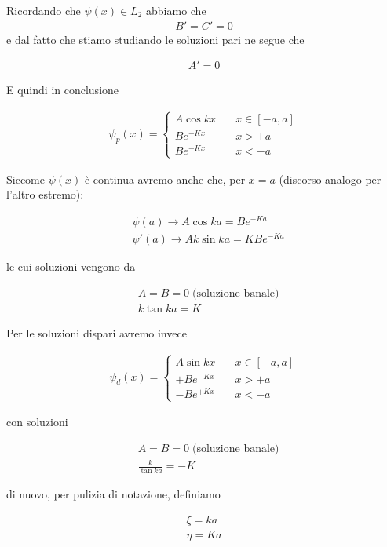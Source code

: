 Ricordando che $\psi(x)\in L_2$ abbiamo che
\begin{align}
B'= C'=0
\end{align}
e dal fatto che stiamo studiando le soluzioni pari ne segue che

\begin{align}
A'=0
\end{align}

E quindi in conclusione

\begin{align}
\psi_p(x)=
\left\{
\begin{array}{ccc}
A\cos{kx} \quad {}&x\in [-a,a] \\
Be^{-Kx} \quad &x>+a \\
Be^{-Kx} \quad &x<-a
\end{array} 
\right.
\end{align}

Siccome $\psi(x)$ è continua avremo anche che, per $x=a$ (discorso analogo per l'altro estremo):

\begin{align}
{}&\psi(a)\rightarrow A\cos{ka}= Be^{-Ka} \\
&\psi'(a)\rightarrow Ak\sin{ka}= KBe^{-Ka}
\end{align}

le cui soluzioni vengono da

\begin{align}
{}&A=B=0 \; \text{(soluzione banale)}\\
&k\tan{ka}=K
\end{align}

Per le soluzioni dispari avremo invece

\begin{align}
\psi_d(x)=
\left\{
\begin{array}{ccc}
A\sin{kx} \quad {}&x\in [-a,a] \\
+Be^{-Kx} \quad &x>+a \\
-Be^{+Kx} \quad &x<-a
\end{array} 
\right.
\end{align}

con soluzioni

\begin{align}
{}&A=B=0 \; \text{(soluzione banale)}\\
&\frac{k}{\tan{ka}}=-K
\end{align}
 
di nuovo, per pulizia di notazione, definiamo

\begin{align}
\xi=ka \\
\eta= Ka
\end{align}


